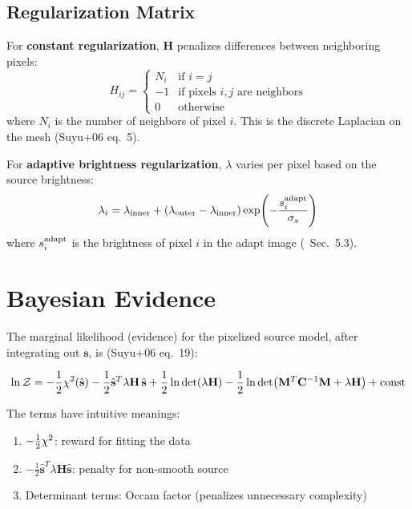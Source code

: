 \documentclass[11pt, letterpaper]{article}
\begin{document}
\subsection{Regularization Matrix}

For \textbf{constant regularization}, $\mathbf{H}$ penalizes differences
between neighboring pixels:
\begin{equation}
H_{ij} = \begin{cases}
  N_i & \text{if } i = j \\
  -1  & \text{if pixels } i, j \text{ are neighbors} \\
  0   & \text{otherwise}
\end{cases}
\label{eq:H-constant}
\end{equation}
where $N_i$ is the number of neighbors of pixel $i$. This is the
discrete Laplacian on the mesh (Suyu+06 eq.~5).

For \textbf{adaptive brightness regularization}, $\lambda$ varies
per pixel based on the source brightness:
\begin{equation}
\lambda_i = \lambda_{\rm inner}
+ (\lambda_{\rm outer} - \lambda_{\rm inner})
\exp\!\left(-\frac{s_i^{\rm adapt}}{\sigma_s}\right)
\label{eq:adaptive-reg}
\end{equation}
where $s_i^{\rm adapt}$ is the brightness of pixel $i$ in the adapt
image (\Night\ Sec.~5.3).

\section{Bayesian Evidence}
\label{sec:evidence}

The marginal likelihood (evidence) for the pixelized source model,
after integrating out $\mathbf{s}$, is (Suyu+06 eq.~19):

\begin{keyresult}
\begin{equation}
\ln\mathcal{Z} = -\frac{1}{2}\chi^2(\hat{\mathbf{s}})
- \frac{1}{2}\hat{\mathbf{s}}^T \lambda\mathbf{H}\,\hat{\mathbf{s}}
+ \frac{1}{2}\ln\det(\lambda\mathbf{H})
- \frac{1}{2}\ln\det(\mathbf{M}^T\mathbf{C}^{-1}\mathbf{M} + \lambda\mathbf{H})
+ \text{const}
\label{eq:evidence}
\end{equation}
\end{keyresult}

The terms have intuitive meanings:
\begin{enumerate}[nosep]
  \item $-\frac{1}{2}\chi^2$: reward for fitting the data
  \item $-\frac{1}{2}\hat{\mathbf{s}}^T\lambda\mathbf{H}\hat{\mathbf{s}}$:
    penalty for non-smooth source
  \item Determinant terms: Occam factor (penalizes unnecessary complexity)
\end{enumerate}
\end{document}
